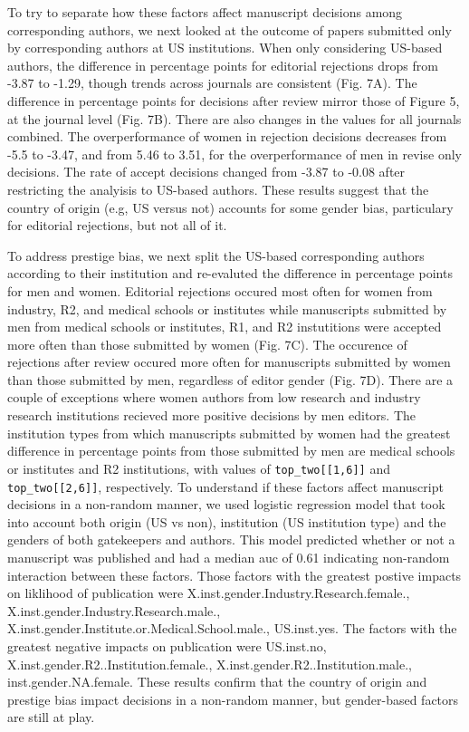 \documentclass[11pt,]{article}
\begin{document}
To try to separate how these factors affect manuscript decisions among
corresponding authors, we next looked at the outcome of papers submitted
only by corresponding authors at US institutions. When only considering
US-based authors, the difference in percentage points for editorial
rejections drops from -3.87 to -1.29, though trends across journals are
consistent (Fig. 7A). The difference in percentage points for decisions
after review mirror those of Figure 5, at the journal level (Fig. 7B).
There are also changes in the values for all journals combined. The
overperformance of women in rejection decisions decreases from -5.5 to
-3.47, and from 5.46 to 3.51, for the overperformance of men in revise
only decisions. The rate of accept decisions changed from -3.87 to -0.08
after restricting the analyisis to US-based authors. These results
suggest that the country of origin (e.g, US versus not) accounts for
some gender bias, particulary for editorial rejections, but not all of
it.

To address prestige bias, we next split the US-based corresponding
authors according to their institution and re-evaluted the difference in
percentage points for men and women. Editorial rejections occured most
often for women from industry, R2, and medical schools or institutes
while manuscripts submitted by men from medical schools or institutes,
R1, and R2 instutitions were accepted more often than those submitted by
women (Fig. 7C). The occurence of rejections after review occured more
often for manuscripts submitted by women than those submitted by men,
regardless of editor gender (Fig. 7D). There are a couple of exceptions
where women authors from low research and industry research institutions
recieved more positive decisions by men editors. The institution types
from which manuscripts submitted by women had the greatest difference in
percentage points from those submitted by men are medical schools or
institutes and R2 institutions, with values of
\texttt{top\_two{[}{[}1,6{]}{]}} and \texttt{top\_two{[}{[}2,6{]}{]}},
respectively. To understand if these factors affect manuscript decisions
in a non-random manner, we used logistic regression model that took into
account both origin (US vs non), institution (US institution type) and
the genders of both gatekeepers and authors. This model predicted
whether or not a manuscript was published and had a median auc of 0.61
indicating non-random interaction between these factors. Those factors
with the greatest postive impacts on liklihood of publication were
X.inst.gender.Industry.Research.female.,
X.inst.gender.Industry.Research.male.,
X.inst.gender.Institute.or.Medical.School.male., US.inst.yes. The
factors with the greatest negative impacts on publication were
US.inst.no, X.inst.gender.R2..Institution.female.,
X.inst.gender.R2..Institution.male., inst.gender.NA.female. These
results confirm that the country of origin and prestige bias impact
decisions in a non-random manner, but gender-based factors are still at
play.
\end{document}
